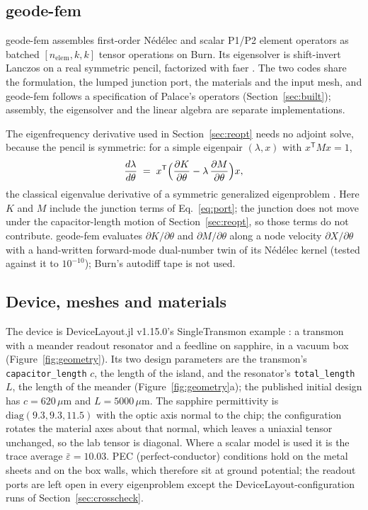 \documentclass{anvil-paper}
\begin{document}
\subsection{geode-fem}
\label{sec:architecture}

geode-fem assembles first-order N\'ed\'elec \citep{nedelec1980} and scalar
P1/P2 element operators as batched $[n_{\mathrm{elem}},k,k]$ tensor
operations on Burn. Its eigensolver is shift-invert Lanczos \citep{arpack}
on a real symmetric pencil, factorized with faer \citep{kazdadi2026faer}. The two codes share the
formulation, the lumped junction port, the materials and the input mesh,
and geode-fem follows a specification of Palace's operators
(Section~\ref{sec:built}); assembly, the eigensolver and the linear algebra
are separate implementations.

The eigenfrequency derivative used in Section~\ref{sec:reopt} needs no
adjoint solve, because the pencil is symmetric: for a simple eigenpair
$(\lambda, x)$ with $x^{\mathsf T}Mx = 1$,
\begin{equation}
  \frac{d\lambda}{d\theta} \;=\;
  x^{\mathsf T}\Bigl(\frac{\partial K}{\partial\theta}
  - \lambda\,\frac{\partial M}{\partial\theta}\Bigr)x ,
  \label{eq:hf-eig}
\end{equation}
the classical eigenvalue derivative of a symmetric generalized eigenproblem
\citep{foxkapoor1968rates}. Here $K$ and $M$ include the junction terms of
Eq.~\eqref{eq:port}; the junction does not move under the capacitor-length
motion of Section~\ref{sec:reopt}, so those terms do not contribute.
geode-fem evaluates $\partial K/\partial\theta$ and $\partial
M/\partial\theta$ along a node velocity $\partial X/\partial\theta$ with a
hand-written forward-mode dual-number twin of its N\'ed\'elec kernel
(tested against it to $10^{-10}$); Burn's autodiff tape is not used.

\subsection{Device, meshes and materials}
\label{sec:geometry}

The device is DeviceLayout.jl v1.15.0's SingleTransmon example
\citep{devicelayout}: a transmon \citep{koch2007charge} with a meander readout resonator and a
feedline on sapphire, in a vacuum box (Figure~\ref{fig:geometry}). Its two
design parameters are the transmon's \texttt{capacitor\_length} $c$, the
length of the island, and the resonator's \texttt{total\_length} $L$, the
length of the meander (Figure~\ref{fig:geometry}a); the published initial design has
$c = 620\,\mu$m and $L = 5000\,\mu$m. The sapphire permittivity is
$\mathrm{diag}(9.3, 9.3, 11.5)$ with the optic axis normal to the chip;
the configuration rotates the material axes about that normal, which
leaves a uniaxial tensor unchanged, so the lab tensor is diagonal. Where a
scalar model is used it is the trace average $\bar\varepsilon = 10.03$.
PEC (perfect-conductor) conditions hold on the metal sheets and on the box
walls, which therefore sit at ground potential; the readout ports are left
open in every eigenproblem except the DeviceLayout-configuration runs of
Section~\ref{sec:crosscheck}.
\end{document}

